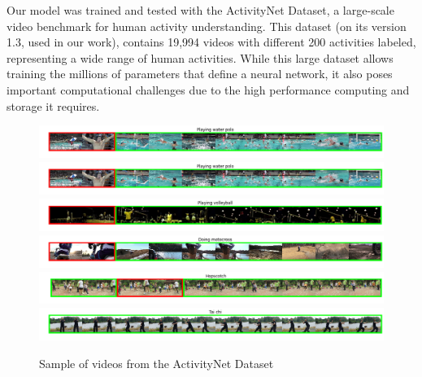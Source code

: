 Our model was trained and tested with the ActivityNet Dataset\cite{caba2015activitynet}, a large-scale video benchmark for human activity understanding. This dataset (on its version 1.3, used in our work), contains 19,994 videos with different 200 activities labeled, representing a wide range of human activities. While this large dataset allows training the millions of parameters that define a neural network, it also poses important computational challenges due to the high performance computing and storage it requires.

\begin{figure}[t]
\begin{center}
\includegraphics[width=1\linewidth]{img/methodology/activitynet_examples/activitynet_example_1}
\includegraphics[width=1\linewidth]{img/methodology/activitynet_examples/activitynet_example_2}
\includegraphics[width=1\linewidth]{img/methodology/activitynet_examples/activitynet_example_3}
\includegraphics[width=1\linewidth]{img/methodology/activitynet_examples/activitynet_example_4}
\includegraphics[width=1\linewidth]{img/methodology/activitynet_examples/activitynet_example_5}
\includegraphics[width=1\linewidth]{img/methodology/activitynet_examples/activitynet_example_6}
\end{center}
\caption{Sample of videos from the ActivityNet Dataset}
\label{fig:dataset_example}
\end{figure}

